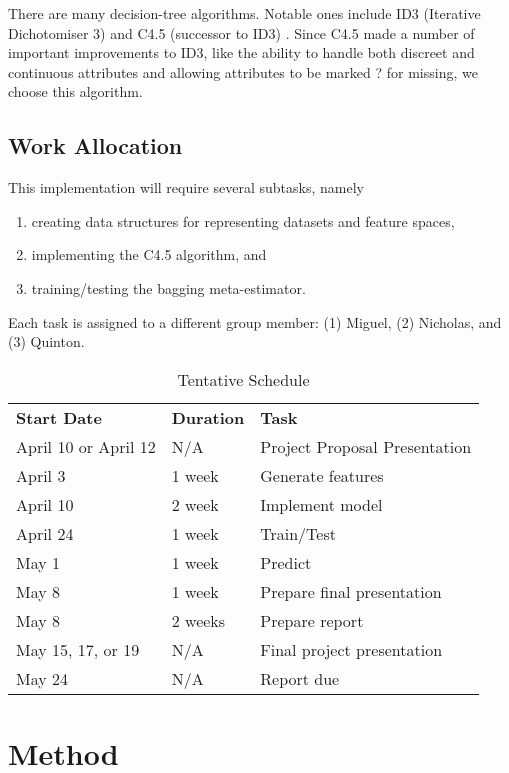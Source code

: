 \documentclass[12pt]{amsproc}
\theoremstyle{definition}
\begin{document}
	There are many decision-tree algorithms. Notable ones include ID3 (Iterative Dichotomiser 3) and C4.5 (successor to ID3) \cite{wikipedia:decision_tree}. 
	Since C4.5 made a number of important improvements to ID3, like the ability to handle both discreet and continuous attributes and allowing attributes to be marked ? for missing, we choose this algorithm.
	
	\subsection{Work Allocation}
	
	This implementation will require several subtasks, namely
	
	\begin{enumerate}
		\item creating data structures for representing datasets and feature spaces,
		\item implementing the C4.5 algorithm, and
		\item training/testing the bagging meta-estimator. 
	\end{enumerate}
	
	Each task is assigned to a different group member: (1) Miguel, (2) Nicholas, and (3) Quinton. 


	\begin{table}[h!]
		\centering
		\caption{Tentative Schedule}
		\label{Tentative Schedule}
		\begin{tabular}{lll}
			\textbf{Start Date} & \textbf{Duration} & \textbf{Task} \\
			April 10 or April 12 & N/A & Project Proposal Presentation \\
			April 3 & 1 week & Generate features \\
			April 10 & 2 week & Implement model \\
			April 24 & 1 week & Train/Test \\
			May 1 & 1 week & Predict \\
			May 8 & 1 week & Prepare final presentation \\
			May 8 & 2 weeks & Prepare report \\
			May 15, 17, or 19 & N/A & Final project presentation \\
			May 24 & N/A & Report due
		\end{tabular}
	\end{table}
	
	
	\section{Method}\label{method}
	
\end{document}
